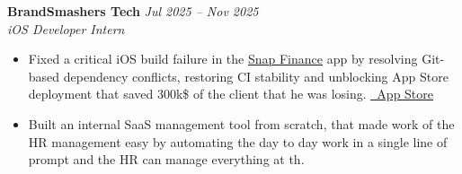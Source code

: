 \documentclass[a4paper,12pt]{article}
\begin{document}
\textbf{BrandSmashers Tech} \hfill \textit{Jul 2025 – Nov 2025} \\
\textit{iOS Developer Intern}
\begin{itemize}
\item Fixed a critical iOS build failure in the \href{https://apps.apple.com/us/app/snap-finance/id1580164214}{Snap Finance} app by resolving Git-based dependency conflicts, restoring CI stability and unblocking App Store deployment that saved 300k\$ of the client that he was losing. \hfill \href{https://apps.apple.com/us/app/snap-finance/id1580164214}{\scriptsize\underline{\faApple\ App Store}}

\item Built an internal SaaS management tool from scratch, that made work of the HR management easy by automating the day to day work in a single line of prompt and the HR can manage everything at th.
\end{itemize}

\end{document}
